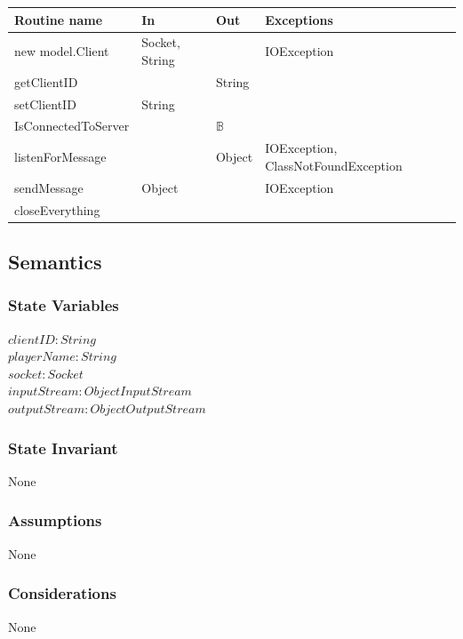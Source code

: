 \documentclass[12pt, titlepage]{article}
\begin{document}
        \begin{tabular}{| l | l | l | p{6cm} |}
            \hline
            \textbf{Routine name} & \textbf{In} & \textbf{Out} & \textbf{Exceptions}\\
            \hline
            new model.Client & Socket, String &  & IOException\\
            \hline
            getClientID &  & String & \\
            \hline 
            setClientID & String &  &\\
            \hline 
            IsConnectedToServer & & $\mathbb{B}$ &\\
            \hline 
            listenForMessage & & Object & IOException, ClassNotFoundException\\
            \hline 
            sendMessage & Object & & IOException\\
            \hline 
            closeEverything &  &  &\\
            \hline
        \end{tabular}
        
    \subsection* {Semantics}
    
    \subsubsection* {State Variables}
        $\mathit{clientID}: String$\\
        $\mathit{playerName}: String$\\
        $\mathit{socket} : Socket$\\
        $\mathit{inputStream}: ObjectInputStream$\\
        $\mathit{outputStream} : ObjectOutputStream$\\

    \subsubsection* {State Invariant}
        None
    
    \subsubsection* {Assumptions}
        None
    
    \subsubsection* {Considerations}
        None
    
\end{document}

